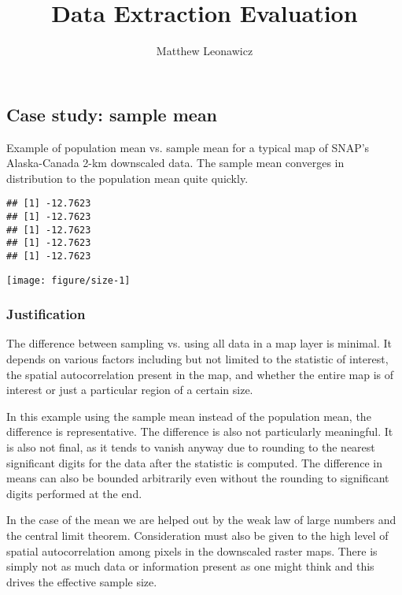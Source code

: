 \documentclass{article}\usepackage[]{graphicx}\usepackage[]{color}
\makeatletter
\def\maxwidth{ %
  \ifdim\Gin@nat@width>\linewidth
    \linewidth
  \else
    \Gin@nat@width
  \fi
}
\newenvironment{kframe}{%
 \def\at@end@of@kframe{}%
 \ifinner\ifhmode%
  \def\at@end@of@kframe{\end{minipage}}%
  \begin{minipage}{\columnwidth}%
 \fi\fi%
 \def\FrameCommand##1{\hskip\@totalleftmargin \hskip-\fboxsep
 \colorbox{shadecolor}{##1}\hskip-\fboxsep
     \hskip-\linewidth \hskip-\@totalleftmargin \hskip\columnwidth}%
 \MakeFramed {\advance\hsize-\width
   \@totalleftmargin\z@ \linewidth\hsize
   \@setminipage}}%
 {\par\unskip\endMakeFramed%
 \at@end@of@kframe}
\newenvironment{knitrout}{}{} %
\makeatother
\begin{document}
\title{Data Extraction Evaluation}
\author{Matthew Leonawicz}
\maketitle





\subsection{Case study: sample mean}

Example of population mean vs. sample mean for a typical map of SNAP's Alaska-Canada 2-km downscaled data.
The sample mean converges in distribution to the population mean quite quickly.





\begin{knitrout}
\color{fgcolor}\begin{kframe}
\begin{verbatim}
## [1] -12.7623
## [1] -12.7623
## [1] -12.7623
## [1] -12.7623
## [1] -12.7623
\end{verbatim}
\end{kframe}
\end{knitrout}



\begin{knitrout}
\color{fgcolor}
\texttt{[image: figure/size-1]} 

\end{knitrout}

\subsubsection{Justification}

The difference between sampling vs. using all data in a map layer is minimal.
It depends on various factors including but not limited to the statistic of interest, the spatial autocorrelation present in the map, and whether the entire map is of interest or just a particular region of a certain size.

In this example using the sample mean instead of the population mean, the difference is representative.
The difference is also not particularly meaningful.
It is also not final, as it tends to vanish anyway due to rounding to the nearest significant digits for the data after the statistic is computed.
The difference in means can also be bounded arbitrarily even without the rounding to significant digits performed at the end.

In the case of the mean we are helped out by the weak law of large numbers and the central limit theorem.
Consideration must also be given to the high level of spatial autocorrelation among pixels in the downscaled raster maps.
There is simply not as much data or information present as one might think and this drives the effective sample size.
\end{document}
